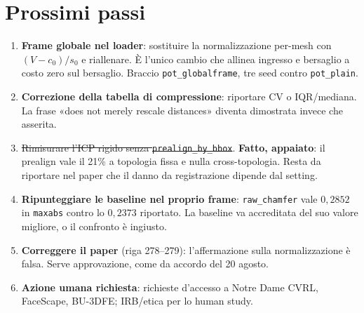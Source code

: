 \documentclass[11pt,a4paper]{article}
\begin{document}
\section{Prossimi passi}
\begin{enumerate}
\item \textbf{Frame globale nel loader}: sostituire la normalizzazione per-mesh con
      $(V-c_0)/s_0$ e riallenare. \`E l'unico cambio che allinea ingresso e bersaglio a costo
      zero sul bersaglio. Braccio \texttt{pot\_globalframe}, tre seed contro \texttt{pot\_plain}.
\item \textbf{Correzione della tabella di compressione}: riportare CV o IQR/mediana. La frase
      «does not merely rescale distances» diventa dimostrata invece che asserita.
\item \sout{Rimisurare l'ICP rigido senza \texttt{prealign\_by\_bbox}}. \textbf{Fatto,
      appaiato}: il prealign vale il 21\% a topologia fissa e nulla cross-topologia. Resta da
      riportare nel paper che il danno da registrazione dipende dal setting.
\item \textbf{Ripunteggiare le baseline nel proprio frame}: \texttt{raw\_chamfer} vale $0{,}2852$
      in \texttt{maxabs} contro lo $0{,}2373$ riportato. La baseline va accreditata del suo
      valore migliore, o il confronto \`e ingiusto.
\item \textbf{Correggere il paper} (riga 278--279): l'affermazione sulla normalizzazione \`e
      falsa. Serve approvazione, come da accordo del 20 agosto.
\item \textbf{Azione umana richiesta}: richieste d'accesso a Notre Dame CVRL, FaceScape,
      BU-3DFE; IRB/etica per lo human study.
\end{enumerate}
\end{document}
